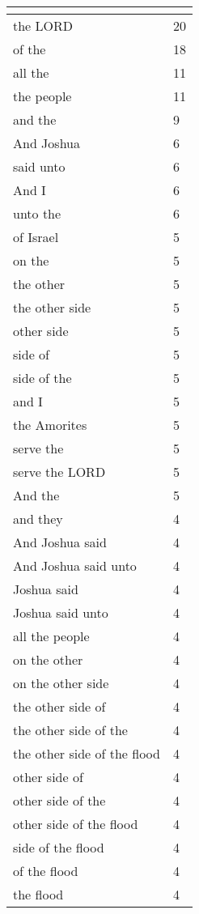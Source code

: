 \begin{center}
\begin{longtable}{|p{3.0in}|p{0.5in}|}
\hline \multicolumn{2}{c}{{ }} \\ \hline
\endfoot 
the LORD & 20\\ \hline 
of the & 18\\ \hline 
all the & 11\\ \hline 
the people & 11\\ \hline 
and the & 9\\ \hline 
And Joshua & 6\\ \hline 
said unto & 6\\ \hline 
And I & 6\\ \hline 
unto the & 6\\ \hline 
of Israel & 5\\ \hline 
on the & 5\\ \hline 
the other & 5\\ \hline 
the other side & 5\\ \hline 
other side & 5\\ \hline 
side of & 5\\ \hline 
side of the & 5\\ \hline 
and I & 5\\ \hline 
the Amorites & 5\\ \hline 
serve the & 5\\ \hline 
serve the LORD & 5\\ \hline 
And the & 5\\ \hline 
and they & 4\\ \hline 
And Joshua said & 4\\ \hline 
And Joshua said unto & 4\\ \hline 
Joshua said & 4\\ \hline 
Joshua said unto & 4\\ \hline 
all the people & 4\\ \hline 
on the other & 4\\ \hline 
on the other side & 4\\ \hline 
the other side of & 4\\ \hline 
the other side of the & 4\\ \hline 
the other side of the flood & 4\\ \hline 
other side of & 4\\ \hline 
other side of the & 4\\ \hline 
other side of the flood & 4\\ \hline 
side of the flood & 4\\ \hline 
of the flood & 4\\ \hline 
the flood & 4\\ \hline 

\end{longtable}
\end{center}
